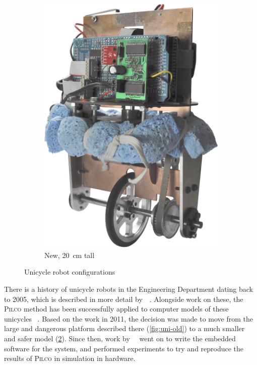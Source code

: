 \documentclass[main.tex]{subfiles}
\begin{document}
\begin{figure}[!b]
\begin{subfigure}{0.3\linewidth}
			\includegraphics[width=\linewidth]{figures/front.jpg}
			\caption{New, \SI{20}{\centi\meter} tall}
			\label{fig:uni-new}
		\end{subfigure}
		\hspace*{\fill}
		\caption{Unicycle robot configurations}
	\end{figure}

	There is a history of unicycle robots in the Engineering Department dating back to 2005, which is described in more detail by~\citeauthor{queiro}~\cite{queiro}.
	Alongside work on these, the \textsc{Pilco} method has been successfully applied to computer models of these unicycles ~\cite[section~3.3]{pilco}.
	Based on the work in 2011, the decision was made to move from the large and dangerous platform described there (\cref{fig:uni-old}) to a much smaller and safer model (\cref{fig:uni-new}).
	Since then, work by~\citeauthor{aleksi}~\cite{aleksi} went on to write the embedded software for the system, and performed experiments to try and reproduce the results of \textsc{Pilco} in simulation in hardware.
\end{document}

